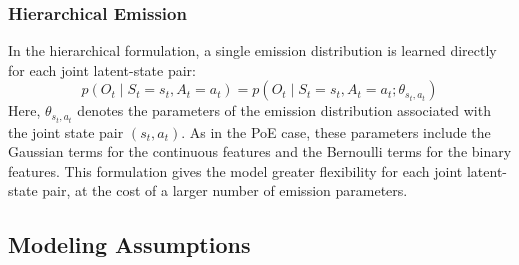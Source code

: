\subsubsection{Hierarchical Emission}
\label{subsubsec:hierarchical_emission}
In the hierarchical formulation, a single emission distribution is learned directly for each joint latent-state pair:
\begin{equation}
p(O_t \mid S_t=s_t, A_t=a_t) = p(O_t \mid S_t=s_t, A_t=a_t; \theta_{s_t,a_t})
\end{equation}
Here, $\theta_{s_t,a_t}$ denotes the parameters of the emission distribution associated with the joint state pair $(s_t, a_t)$. 
As in the \ac{PoE} case, these parameters include the Gaussian terms for the continuous features and the Bernoulli terms for the binary features.
This formulation gives the model greater flexibility for each joint latent-state pair, at the cost of a larger number of emission parameters.



\subsection{Modeling Assumptions}
\label{subsec:modeling_assumptions}

